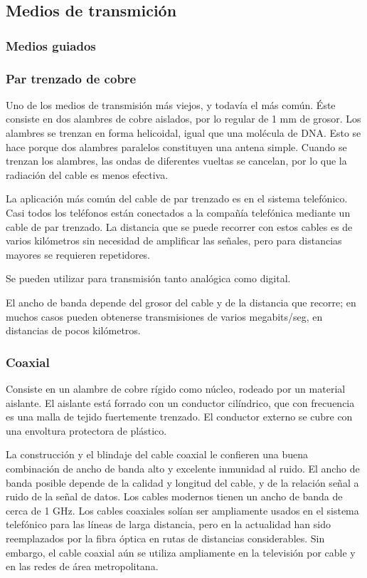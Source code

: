  \subsection{Medios de transmición}
 \subsubsection{Medios guiados}
 \subsubsection*{Par trenzado de cobre} Uno de los medios de transmisión más viejos, y todavía el más común. Éste consiste en dos alambres de cobre aislados, por lo regular de 1 mm de grosor. Los alambres se trenzan en forma helicoidal, igual que una molécula de DNA. Esto se hace porque dos alambres paralelos constituyen una antena simple. Cuando se trenzan los alambres, las ondas de diferentes vueltas se cancelan, por lo que la radiación del cable es menos efectiva.

La aplicación más común del cable de par trenzado es en el sistema telefónico. Casi todos los teléfonos están conectados a la compañía telefónica mediante un cable de par trenzado. La distancia que se puede recorrer con estos cables es de varios kilómetros sin necesidad de amplificar las señales, pero para distancias mayores se requieren repetidores.
    
Se pueden utilizar para transmisión tanto analógica como digital. 

El ancho de banda depende del grosor del cable y de la distancia que recorre; en muchos casos pueden obtenerse transmisiones de varios megabits/seg, en distancias de pocos kilómetros.

\subsubsection*{Coaxial}
Consiste en un alambre de cobre rígido como núcleo, rodeado por un material aislante. El aislante está forrado con un conductor cilíndrico, que con frecuencia es una malla de tejido fuertemente trenzado. El conductor externo se cubre con una envoltura protectora de plástico.

La construcción y el blindaje del cable coaxial le confieren una buena combinación de ancho de banda alto y excelente inmunidad al ruido. El ancho de banda posible depende de la calidad y longitud del cable, y de la relación señal a ruido de la señal de datos. Los cables modernos tienen un ancho de banda de cerca de 1 GHz. Los cables coaxiales solían ser ampliamente usados en el sistema telefónico para las líneas de larga distancia, pero en la actualidad han sido reemplazados
por la fibra óptica en rutas de distancias considerables. Sin embargo, el cable coaxial aún se utiliza ampliamente en la televisión por cable y en las redes de área metropolitana.


